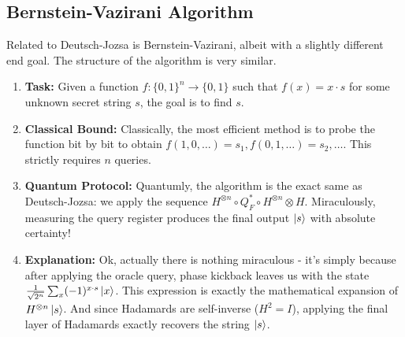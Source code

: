 \subsection{Bernstein-Vazirani Algorithm}
Related to Deutsch-Jozsa is Bernstein-Vazirani, albeit with a slightly different end goal. The structure of the algorithm is very similar. 

\begin{enumerate}
    \item \textbf{Task:} Given a function $f: \{0,1\}^n \rightarrow \{0,1\}$ such that $f(x)=x \cdot s$ for some unknown secret string $s$, the goal is to find $s$.
    \item \textbf{Classical Bound:} Classically, the most efficient method is to probe the function bit by bit to obtain $f(1,0,\dots)=s_1, f(0,1,\dots)=s_2, \dots$. This strictly requires $n$ queries.
    
    \item \textbf{Quantum Protocol:} Quantumly, the algorithm is the exact same as Deutsch-Jozsa: we apply the sequence $H^{\otimes n} \circ Q_F^* \circ H^{\otimes n}\otimes H$. Miraculously, measuring the query register produces the final output $\ket{s}$ with absolute certainty!
    
    \item \textbf{Explanation:} Ok, actually there is nothing miraculous - it's simply because after applying the oracle query, phase kickback leaves us with the state $\frac{1}{\sqrt{2^n}} \sum_x (-1)^{x \cdot s} \ket{x}$. This expression is exactly the mathematical expansion of $H^{\otimes n}\ket{s}$. And since Hadamards are self-inverse ($H^2 = I$), applying the final layer of Hadamards exactly recovers the string $\ket{s}$.
\end{enumerate}
